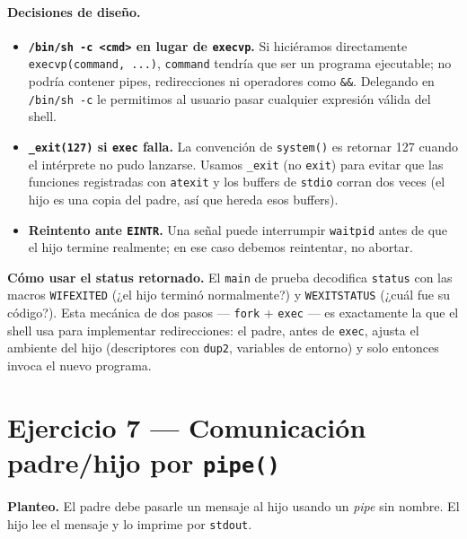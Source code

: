 \documentclass[11pt,a4paper]{article}
\begin{document}
\paragraph{Decisiones de diseño.}
\begin{itemize}[leftmargin=*]
    \item \textbf{\texttt{/bin/sh -c <cmd>} en lugar de \texttt{execvp}.}
        Si hiciéramos directamente \texttt{execvp(command, ...)},
        \texttt{command} tendría que ser un programa ejecutable; no
        podría contener pipes, redirecciones ni operadores como
        \texttt{\&\&}. Delegando en \texttt{/bin/sh -c} le permitimos
        al usuario pasar cualquier expresión válida del shell.
    \item \textbf{\texttt{\_exit(127)} si \texttt{exec} falla.} La
        convención de \texttt{system()} es retornar 127 cuando el
        intérprete no pudo lanzarse. Usamos \texttt{\_exit} (no
        \texttt{exit}) para evitar que las funciones registradas con
        \texttt{atexit} y los buffers de \texttt{stdio} corran dos
        veces (el hijo es una copia del padre, así que hereda esos
        buffers).
    \item \textbf{Reintento ante \texttt{EINTR}.} Una señal puede
        interrumpir \texttt{waitpid} antes de que el hijo termine
        realmente; en ese caso debemos reintentar, no abortar.
\end{itemize}

\textbf{Cómo usar el status retornado.} El \texttt{main} de prueba
decodifica \texttt{status} con las macros \texttt{WIFEXITED} (¿el hijo
terminó normalmente?) y \texttt{WEXITSTATUS} (¿cuál fue su código?).
Esta mecánica de dos pasos --- \texttt{fork} + \texttt{exec} --- es
exactamente la que el shell usa para implementar redirecciones: el
padre, antes de \texttt{exec}, ajusta el ambiente del hijo
(descriptores con \texttt{dup2}, variables de entorno) y solo entonces
invoca el nuevo programa.

\section{Ejercicio 7 --- Comunicación padre/hijo por \texttt{pipe()}}

\textbf{Planteo.} El padre debe pasarle un mensaje al hijo usando un
\emph{pipe} sin nombre. El hijo lee el mensaje y lo imprime por
\texttt{stdout}.
\end{document}
